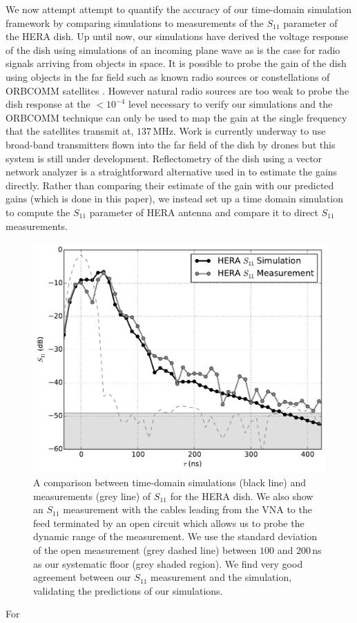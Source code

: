 \documentclass[twocolumn]{emulateapj}
\begin{document}
We now attempt attempt to quantify the accuracy of our time-domain simulation framework by comparing simulations to measurements of the $S_{11}$ parameter of the HERA dish. Up until now, our simulations have derived the voltage response of the dish using simulations of an incoming plane wave as is the case for radio signals arriving from objects in space. It is possible to probe the gain of the dish using objects in the far field such as known radio sources \citep{Thyagarajan:2011,Pober:2012,Colgate:2015} or constellations of ORBCOMM satellites \citep{Neben:2015,Neben:2016}. However natural radio sources are too weak to probe the dish response at the $<10^{-4}$ level necessary to verify our simulations and the ORBCOMM technique can only be used to map the gain at the single frequency that the satellites transmit at, $137$\,MHz. Work is currently underway to use broad-band transmitters flown into the far field of the dish by drones \citep{Jacobs:2016} but this system is still under development. Reflectometry of the dish using a vector network analyzer is a straightforward alternative used in \citet{Patra:2016} to estimate the gains directly. Rather than comparing their estimate of the gain with our predicted gains (which is done in this paper), we instead set up a time domain simulation to compute the $S_{11}$ parameter of HERA antenna and compare it to direct $S_{11}$ measurements.
\begin{figure}
\includegraphics[width=.5\textwidth]{figures/s11_compare.pdf}
\caption{A comparison between time-domain simulations (black line) and measurements (grey line) of $S_{11}$ for the HERA dish. We also show an $S_{11}$ measurement with the cables leading from the VNA to the feed terminated by an open circuit which allows us to probe the dynamic range of the measurement. We use the standard deviation of the open measurement (grey dashed line) between $100$ and $200$\,ns as our systematic floor (grey shaded region). We find very good agreement between our $S_{11}$ measurement and the simulation, validating the predictions of our simulations.}
\label{fig:S11}
\end{figure}
For 
\end{document}
